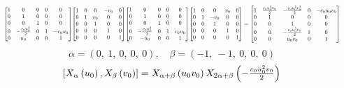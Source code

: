 \documentclass[11pt]{article}
\theoremstyle{definition}
\begin{document}
\[
\scaletoalign{\textwidth}{{\left[\begin{matrix}1 & 0 & 0 & 0 & 0\\0 & 1 & 0 & 0 & 0\\0 & 0 & 1 & 0 & 0\\0 & - \frac{c_{0} u_{0}^{2}}{2} & 0 & 1 & - c_{0} u_{0}\\0 & u_{0} & 0 & 0 & 1\end{matrix}\right]} {\left[\begin{matrix}1 & 0 & 0 & - v_{0} & 0\\0 & 1 & v_{0} & 0 & 0\\0 & 0 & 1 & 0 & 0\\0 & 0 & 0 & 1 & 0\\0 & 0 & 0 & 0 & 1\end{matrix}\right]} {\left[\begin{matrix}1 & 0 & 0 & 0 & 0\\0 & 1 & 0 & 0 & 0\\0 & 0 & 1 & 0 & 0\\0 & - \frac{c_{0} u_{0}^{2}}{2} & 0 & 1 & c_{0} u_{0}\\0 & - u_{0} & 0 & 0 & 1\end{matrix}\right]} {\left[\begin{matrix}1 & 0 & 0 & v_{0} & 0\\0 & 1 & - v_{0} & 0 & 0\\0 & 0 & 1 & 0 & 0\\0 & 0 & 0 & 1 & 0\\0 & 0 & 0 & 0 & 1\end{matrix}\right]} = {\left[\begin{matrix}1 & \frac{c_{0} u_{0}^{2} v_{0}}{2} & - \frac{c_{0} u_{0}^{2} v_{0}^{2}}{2} & 0 & - c_{0} u_{0} v_{0}\\0 & 1 & 0 & 0 & 0\\0 & 0 & 1 & 0 & 0\\0 & 0 & - \frac{c_{0} u_{0}^{2} v_{0}}{2} & 1 & 0\\0 & 0 & u_{0} v_{0} & 0 & 1\end{matrix}\right]}}
\]
\[
\alpha = \left( 0, \  1, \  0, \  0, \  0\right), \quad \beta = \left( -1, \  -1, \  0, \  0, \  0\right)
\]
\[
\scaletoalign{\textwidth}{\left[ X_{\alpha}\left(u_{0}\right), X_{\beta}\left(v_{0}\right) \right] = X_{\alpha + \beta}\left(u_{0} v_{0}\right) X_{2\alpha + \beta}\left(- \frac{c_{0} u_{0}^{2} v_{0}}{2}\right)}
\]
\end{document}
